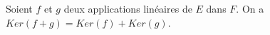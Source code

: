 Soient $f$ et $g$ deux applications linéaires de $E$ dans $F$. On a $Ker(f+g)=Ker(f)+Ker(g)$.

\begin{reponses}
\end{reponses}

\begin{comment}
Prendre par exemple $f=0$.
\end{comment}

